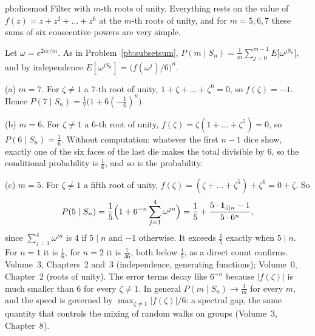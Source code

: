 \begin{solution}{pb:dicemod}
\idea Filter with $m$-th roots of unity. Everything rests on the value of $f(z)=z+z^2+\dots+z^6$ at the $m$-th roots of
unity, and for $m=5,6,7$ these sums of six consecutive powers are very simple.

\writeup Let $\omega=e^{2i\pi/m}$. As in Problem~\ref{pb:subsetsum},
$P(m\mid S_n)=\frac1m\sum_{j=0}^{m-1}E\bigl[\omega^{jS_n}\bigr]$, and by independence
$E[\omega^{jS_n}]=\bigl(f(\omega^j)/6\bigr)^n$.

(a) $m=7$. For $\zeta\ne1$ a $7$-th root of unity, $1+\zeta+\dots+\zeta^6=0$, so $f(\zeta)=-1$. Hence
$P(7\mid S_n)=\frac17\bigl(1+6(-\frac16)^n\bigr)$.

(b) $m=6$. For $\zeta\ne1$ a $6$-th root of unity, $f(\zeta)=\zeta(1+\dots+\zeta^5)=0$, so $P(6\mid S_n)=\frac16$. Without
computation: whatever the first $n-1$ dice show, exactly one of the six faces of the last die makes the total divisible by
$6$, so the conditional probability is $\frac16$, and so is the probability.

(c) $m=5$. For $\zeta\ne1$ a fifth root of unity, $f(\zeta)=(\zeta+\dots+\zeta^5)+\zeta^6=0+\zeta$. So
\[
P(5\mid S_n)=\frac15\Bigl(1+6^{-n}\sum_{j=1}^4\omega^{jn}\Bigr)=\frac15+\frac{5\cdot\mathbf 1_{5\mid n}-1}{5\cdot6^n},
\]
since $\sum_{j=1}^4\omega^{jn}$ is $4$ if $5\mid n$ and $-1$ otherwise. It exceeds $\frac15$ exactly when $5\mid n$. For
$n=1$ it is $\frac16$, for $n=2$ it is $\frac7{36}$, both below $\frac15$, as a direct count confirms.
\tools Volume~3, Chapters~2 and~3 (independence, generating functions); Volume~0, Chapter~2 (roots of unity).
\leads The error terms decay like $6^{-n}$ because $|f(\zeta)|$ is much smaller than $6$ for every $\zeta\ne1$. In general
$P(m\mid S_n)\to\frac1m$ for every $m$, and the speed is governed by $\max_{\zeta\ne1}|f(\zeta)|/6$: a spectral gap, the
same quantity that controls the mixing of random walks on groups (Volume~3, Chapter~8).
\end{solution}

